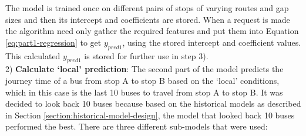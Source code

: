The model is trained once on different pairs of stops of varying routes and gap sizes and then its intercept and coefficients are stored. When a request is made the algorithm need only gather the required features and put them into Equation \ref{eq:part1-regression} to get $y_{pred1}$, using the stored intercept and coefficient values. This calculated $y_{pred1}$ is stored for further use in step 3). \\

2) \textbf{Calculate `local' prediction}: The second part of the model predicts the journey time of a bus from stop A to stop B based on the `local' conditions, which in this case is the last 10 buses to travel from stop A to stop B. It was decided to look back 10 buses because based on the historical models as described in Section \ref{section:historical-model-design}, the model that looked back 10 buses performed the best. There are three different sub-models that were used: \\

